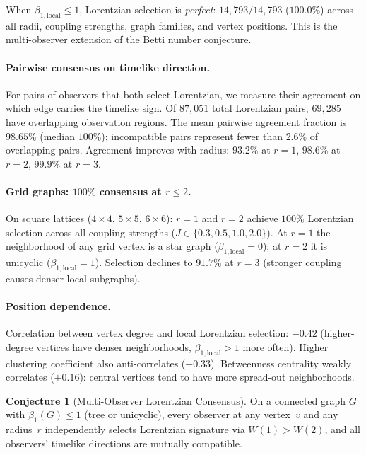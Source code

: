 \documentclass[11pt]{article}
\theoremstyle{definition}
\newtheorem{conjecture}[theorem]{Conjecture}
\theoremstyle{remark}
\begin{document}
\noindent When $\beta_{1,\mathrm{local}} \leq 1$, Lorentzian selection is
\emph{perfect}: $14{,}793/14{,}793$ ($100.0\%$) across all radii,
coupling strengths, graph families, and vertex positions.
This is the multi-observer extension of the Betti number conjecture.

\paragraph{Pairwise consensus on timelike direction.}
For pairs of observers that both select Lorentzian, we measure their
agreement on which edge carries the timelike sign. Of $87{,}051$ total
Lorentzian pairs, $69{,}285$ have overlapping observation regions.
The mean pairwise agreement fraction is $\mathbf{98.65\%}$ (median $100\%$);
incompatible pairs represent fewer than $2.6\%$ of overlapping pairs.
Agreement improves with radius: $93.2\%$ at $r = 1$, $98.6\%$ at $r = 2$,
$99.9\%$ at $r = 3$.

\paragraph{Grid graphs: $100\%$ consensus at $r \leq 2$.}
On square lattices ($4{\times}4$, $5{\times}5$, $6{\times}6$):
$r = 1$ and $r = 2$ achieve $100\%$ Lorentzian selection across all
coupling strengths ($J \in \{0.3, 0.5, 1.0, 2.0\}$). At $r = 1$ the
neighborhood of any grid vertex is a star graph ($\beta_{1,\mathrm{local}} = 0$);
at $r = 2$ it is unicyclic ($\beta_{1,\mathrm{local}} = 1$). Selection
declines to $91.7\%$ at $r = 3$ (stronger coupling causes denser local
subgraphs).

\paragraph{Position dependence.}
Correlation between vertex degree and local Lorentzian selection: $-0.42$
(higher-degree vertices have denser neighborhoods, $\beta_{1,\mathrm{local}} > 1$
more often). Higher clustering coefficient also anti-correlates ($-0.33$).
Betweenness centrality weakly correlates ($+0.16$): central vertices tend
to have more spread-out neighborhoods.

\begin{conjecture}[Multi-Observer Lorentzian Consensus]
\label{conj:multi-observer}
On a connected graph $G$ with $\beta_1(G) \leq 1$ (tree or unicyclic),
every observer at any vertex~$v$ and any radius~$r$ independently selects
Lorentzian signature via $W(1) > W(2)$, and all observers' timelike directions
are mutually compatible.
\end{conjecture}
\end{document}

